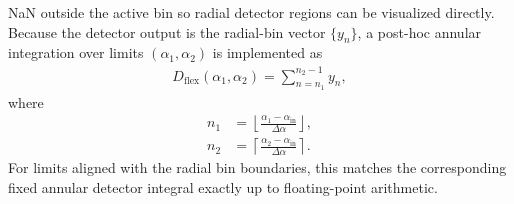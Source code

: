 \documentclass[11pt]{article}
\begin{document}
NaN outside the active bin so radial detector regions can be visualized directly.
Because the detector output is the radial-bin vector $\{y_n\}$, a post-hoc annular
integration over limits $(\alpha_1,\alpha_2)$ is implemented as
\begin{align}
  D_{\mathrm{flex}}(\alpha_1,\alpha_2)
  = \sum_{n=n_1}^{n_2-1} y_n,
\end{align}
where
\begin{align}
  n_1 &= \left\lfloor
    \frac{\alpha_1-\alpha_{\mathrm{in}}}{\Delta \alpha}
  \right\rfloor, \\
  n_2 &= \left\lceil
    \frac{\alpha_2-\alpha_{\mathrm{in}}}{\Delta \alpha}
  \right\rceil.
\end{align}
For limits aligned with the radial bin boundaries, this matches the corresponding fixed
annular detector integral exactly up to floating-point arithmetic.
\end{document}
